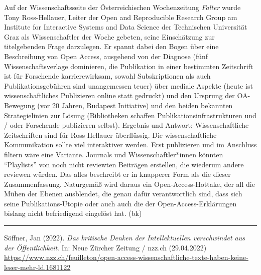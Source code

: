\documentclass[a4paper,
fontsize=11pt,
oneside,
numbers=noperiodatend,
parskip=half-,
bibliography=totoc,
final
]{scrartcl}
\begin{document}
Auf der Wissenschaftsseite der Österreichischen Wochenzeitung
\emph{Falter} wurde Tony Ross-Hellauer, Leiter der Open and Reproducible
Research Group am Institute for Interactive Systems and Data Science der
Technischen Universität Graz als Wissenschaftler der Woche gebeten,
seine Einschätzung zur titelgebenden Frage darzulegen. Er spannt dabei
den Bogen über eine Beschreibung von Open Access, ausgehend von der
Diagnose (fünf Wissenschaftsverlage dominieren, die Publikation in einer
bestimmten Zeitschrift ist für Forschende karrierewirksam, sowohl
Subskriptionen als auch Publikationsgebühren sind unangemessen teuer)
über mediale Aspekte (heute ist wissenschaftliches Publizieren online
statt gedruckt) und den Ursprung der OA-Bewegung (vor 20 Jahren,
Budapest Initiative) und den beiden bekannten Strategielinien zur Lösung
(Bibliotheken schaffen Publikationsinfrastrukturen und / oder Forschende
publizieren selbst). Ergebnis und Antwort: Wissenschaftliche
Zeitschriften sind für Ross-Hellauer überflüssig. Die wissenschaftliche
Kommunikation sollte viel interaktiver werden. Erst publizieren und im
Anschluss filtern wäre eine Variante. Journals und Wissenschaftler*innen
könnten \enquote{Playlists} von noch nicht reviewten Beiträgen
erstellen, die wiederum andere reviewen würden. Das alles beschreibt er
in knapperer Form als die dieser Zusammenfassung. Naturgemäß wird daraus
ein Open-Access-Hottake, der all die Mühen der Ebenen ausblendet, die
genau dafür verantwortlich sind, dass sich seine Publikations-Utopie
oder auch auch die der Open-Access-Erklärungen bislang nicht
befriedigend eingelöst hat. (bk)

\begin{center}\rule{0.5\linewidth}{0.5pt}\end{center}

Söffner, Jan (2022). \emph{Das kritische Denken der Intellektuellen
verschwindet aus der Öffentlichkeit}. In: Neue Zürcher Zeitung / nzz.ch
(29.04.2022)
\url{https://www.nzz.ch/feuilleton/open-access-wissenschaftliche-texte-haben-keine-leser-mehr-ld.1681122}
\end{document}
